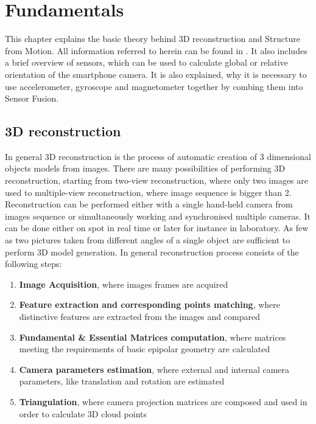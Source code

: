 \ifpdf
    \graphicspath{{figures/}{figures/comparisons}}
\else
    \graphicspath{{figures/}{figures/comparisons}}
\fi


\chapter{Fundamentals} %
This chapter explains the basic theory behind 3D reconstruction and Structure from Motion. All information referred to herein can be found in \cite{HartleyMultipleView}. It also includes a brief overview of sensors, which can be used to calculate global or relative orientation of the smartphone camera. It is also explained, why it is necessary to use accelerometer, gyroscope and magnetometer together by combing them into Sensor Fusion. 

\section{3D reconstruction}
In general 3D reconstruction is the process of automatic creation of 3 dimensional objects models from images. There are many possibilities of performing 3D reconstruction, starting from two-view reconstruction, where only two images are used to multiple-view reconstruction, where image sequence is bigger than 2. Reconstruction can be performed either with a single hand-held camera from images sequence or simultaneously working and synchronised multiple cameras. It can be done either on spot in real time or later for instance in laboratory. As few as two pictures taken from different angles of a single object are sufficient to perform 3D model generation. In general reconstruction process consists of the following steps:
\begin{enumerate}
\item \textbf{Image Acquisition}, where images frames are acquired 
\item \textbf{Feature extraction and corresponding points matching}, where distinctive features are extracted from the images and compared
\item \textbf{Fundamental \& Essential Matrices computation}, where matrices meeting the requirements of basic epipolar geometry are calculated
\item \textbf{Camera parameters estimation}, where external and internal camera parameters, like translation and rotation are estimated
\item \textbf{Triangulation}, where camera projection matrices are composed and used in order to calculate 3D cloud points
\end{enumerate}
